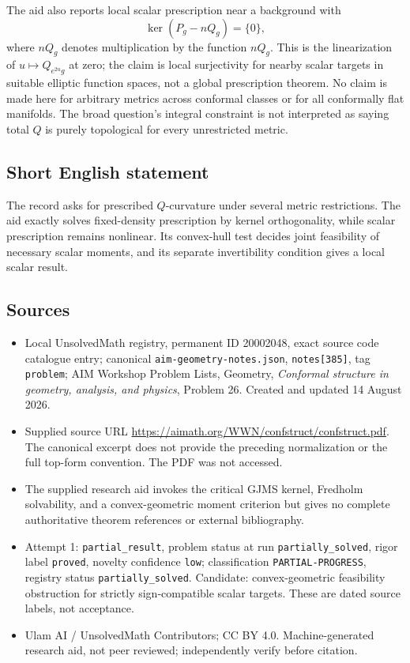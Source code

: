 \documentclass[11pt]{article}
\begin{document}
The aid also reports local scalar prescription near a background with
\[
 \ker(P_g-nQ_g)=\{0\},
\]
where \(nQ_g\) denotes multiplication by the function \(nQ_g\). This is the linearization of \(u\mapsto Q_{e^{2u}g}\) at zero; the claim is local surjectivity for nearby scalar targets in suitable elliptic function spaces, not a global prescription theorem. No claim is made here for arbitrary metrics across conformal classes or for all conformally flat manifolds. The broad question's integral constraint is not interpreted as saying total \(Q\) is purely topological for every unrestricted metric.
\subsection{Short English statement}
The record asks for prescribed \(Q\)-curvature under several metric restrictions. The aid exactly solves fixed-density prescription by kernel orthogonality, while scalar prescription remains nonlinear. Its convex-hull test decides joint feasibility of necessary scalar moments, and its separate invertibility condition gives a local scalar result.
\subsection{Sources}
\begin{itemize}
\item Local UnsolvedMath registry, permanent ID 20002048, exact source code catalogue entry; canonical \texttt{aim-geometry-notes.json}, \texttt{notes[385]}, tag \texttt{problem}; AIM Workshop Problem Lists, Geometry, \emph{Conformal structure in geometry, analysis, and physics}, Problem 26. Created and updated 14 August 2026.
\item Supplied source URL \url{https://aimath.org/WWN/confstruct/confstruct.pdf}. The canonical excerpt does not provide the preceding normalization or the full top-form convention. The PDF was not accessed.
\item The supplied research aid invokes the critical GJMS kernel, Fredholm solvability, and a convex-geometric moment criterion but gives no complete authoritative theorem references or external bibliography.
\item Attempt 1: \texttt{partial\_result}, problem status at run \texttt{partially\_solved}, rigor label \texttt{proved}, novelty confidence \texttt{low}; classification \texttt{PARTIAL-PROGRESS}, registry status \texttt{partially\_solved}. Candidate: convex-geometric feasibility obstruction for strictly sign-compatible scalar targets. These are dated source labels, not acceptance.
\item Ulam AI / UnsolvedMath Contributors; CC BY 4.0. Machine-generated research aid, not peer reviewed; independently verify before citation.
\end{itemize}
\end{document}
